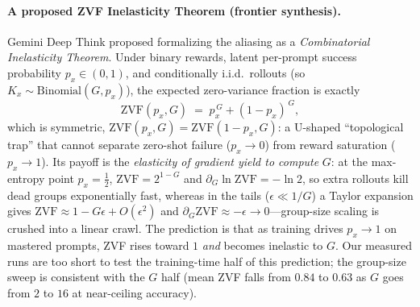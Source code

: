\paragraph{A proposed ZVF Inelasticity Theorem (frontier synthesis).}
Gemini Deep Think proposed formalizing the aliasing as a
\emph{Combinatorial Inelasticity Theorem}. Under binary rewards, latent
per-prompt success probability $p_x\in(0,1)$, and conditionally i.i.d.\
rollouts (so $K_x\sim\mathrm{Binomial}(G,p_x)$), the expected
zero-variance fraction is exactly
\begin{equation}
  \mathrm{ZVF}(p_x,G) \;=\; p_x^{\,G} + (1-p_x)^{\,G},
  \label{eq:zvf-inelasticity}
\end{equation}
which is symmetric, $\mathrm{ZVF}(p_x,G)=\mathrm{ZVF}(1-p_x,G)$: a
U-shaped ``topological trap'' that cannot separate zero-shot failure
($p_x\to0$) from reward saturation ($p_x\to1$). Its payoff is the
\emph{elasticity of gradient yield to compute} $G$: at the max-entropy
point $p_x=\tfrac12$, $\mathrm{ZVF}=2^{1-G}$ and
$\partial_G\ln\mathrm{ZVF}=-\ln 2$, so extra rollouts kill dead groups
exponentially fast, whereas in the tails ($\epsilon\ll 1/G$) a Taylor
expansion gives $\mathrm{ZVF}\approx 1-G\epsilon+O(\epsilon^2)$ and
$\partial_G\mathrm{ZVF}\approx-\epsilon\to 0$---group-size scaling is
crushed into a linear crawl. The prediction is that as training drives
$p_x\to1$ on mastered prompts, ZVF rises toward $1$ \emph{and} becomes inelastic
to $G$. Our measured runs are too short to test the training-time half of this
prediction; the group-size sweep is consistent with the $G$ half (mean ZVF falls
from $0.84$ to $0.63$ as $G$ goes from $2$ to $16$ at near-ceiling accuracy).

